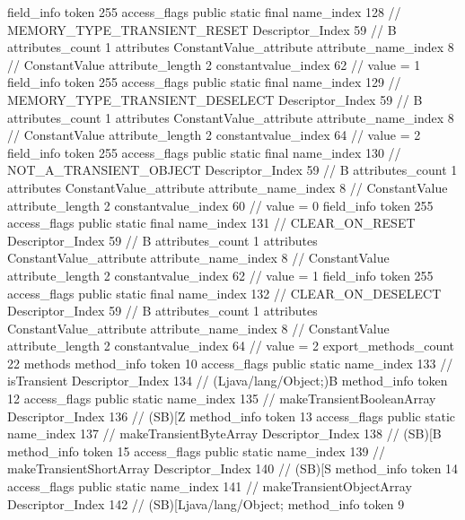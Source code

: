 {{{{{{{				}
				}
			}
			field_info {
				token	255
				access_flags	public static final
				name_index	128		// MEMORY_TYPE_TRANSIENT_RESET
				Descriptor_Index	59		// B
				attributes_count	1
				attributes {
				ConstantValue_attribute {
					attribute_name_index	8		// ConstantValue
					attribute_length	2
					constantvalue_index	62		// value = 1
				}
				}
			}
			field_info {
				token	255
				access_flags	public static final
				name_index	129		// MEMORY_TYPE_TRANSIENT_DESELECT
				Descriptor_Index	59		// B
				attributes_count	1
				attributes {
				ConstantValue_attribute {
					attribute_name_index	8		// ConstantValue
					attribute_length	2
					constantvalue_index	64		// value = 2
				}
				}
			}
			field_info {
				token	255
				access_flags	public static final
				name_index	130		// NOT_A_TRANSIENT_OBJECT
				Descriptor_Index	59		// B
				attributes_count	1
				attributes {
				ConstantValue_attribute {
					attribute_name_index	8		// ConstantValue
					attribute_length	2
					constantvalue_index	60		// value = 0
				}
				}
			}
			field_info {
				token	255
				access_flags	public static final
				name_index	131		// CLEAR_ON_RESET
				Descriptor_Index	59		// B
				attributes_count	1
				attributes {
				ConstantValue_attribute {
					attribute_name_index	8		// ConstantValue
					attribute_length	2
					constantvalue_index	62		// value = 1
				}
				}
			}
			field_info {
				token	255
				access_flags	public static final
				name_index	132		// CLEAR_ON_DESELECT
				Descriptor_Index	59		// B
				attributes_count	1
				attributes {
				ConstantValue_attribute {
					attribute_name_index	8		// ConstantValue
					attribute_length	2
					constantvalue_index	64		// value = 2
				}
				}
			}
			}
			export_methods_count	22
			methods {
				method_info {
					token	10
					access_flags	public static
					name_index	133		// isTransient
					Descriptor_Index	134		// (Ljava/lang/Object;)B
				}
				method_info {
					token	12
					access_flags	public static
					name_index	135		// makeTransientBooleanArray
					Descriptor_Index	136		// (SB)[Z
				}
				method_info {
					token	13
					access_flags	public static
					name_index	137		// makeTransientByteArray
					Descriptor_Index	138		// (SB)[B
				}
				method_info {
					token	15
					access_flags	public static
					name_index	139		// makeTransientShortArray
					Descriptor_Index	140		// (SB)[S
				}
				method_info {
					token	14
					access_flags	public static
					name_index	141		// makeTransientObjectArray
					Descriptor_Index	142		// (SB)[Ljava/lang/Object;
				}
				method_info {
					token	9
}}}}}
